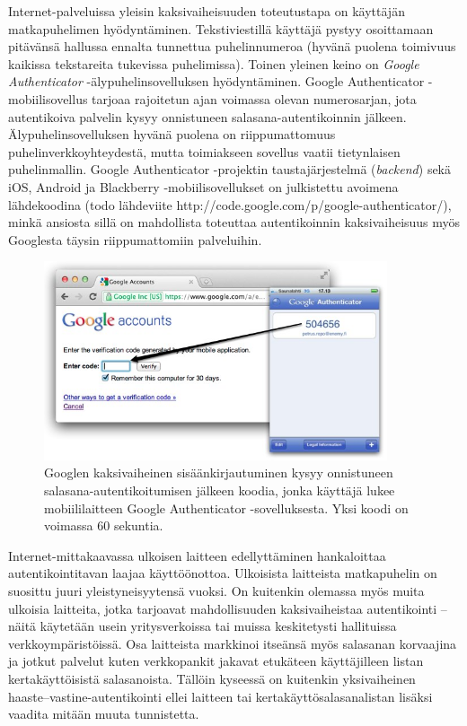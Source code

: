 \documentclass[finnish,gradu]{tktltiki}
\begin{document}
  Internet-palveluissa yleisin kaksivaiheisuuden toteutustapa on käyttäjän matkapuhelimen hyödyntäminen. Tekstiviestillä käyttäjä pystyy osoittamaan pitävänsä hallussa ennalta tunnettua puhelinnumeroa (hyvänä puolena toimivuus kaikissa tekstareita tukevissa puhelimissa). Toinen yleinen keino on \emph{Google Authenticator} -älypuhelinsovelluksen hyödyntäminen. Google Authenticator -mobiilisovellus tarjoaa rajoitetun ajan voimassa olevan numerosarjan, jota autentikoiva palvelin kysyy onnistuneen salasana-autentikoinnin jälkeen. Älypuhelinsovelluksen hyvänä puolena on riippumattomuus puhelinverkkoyhteydestä, mutta toimiakseen sovellus vaatii tietynlaisen puhelinmallin. Google Authenticator -projektin taustajärjestelmä (\emph{backend}) sekä iOS, Android ja Blackberry -mobiilisovellukset on julkistettu avoimena lähdekoodina (todo lähdeviite http://code.google.com/p/google-authenticator/), minkä ansiosta sillä on mahdollista toteuttaa autentikoinnin kaksivaiheisuus myös Googlesta täysin riippumattomiin palveluihin.

  \begin{figure}
    \centering
    \includegraphics[width=0.9\textwidth]{images/google_authenticator.jpg}
    \caption{Googlen kaksivaiheinen sisäänkirjautuminen kysyy onnistuneen salasana-autentikoitumisen jälkeen koodia, jonka käyttäjä lukee mobiililaitteen Google Authenticator -sovelluksesta. Yksi koodi on voimassa 60 sekuntia.}
    \label{fig:google_authenticator}
  \end{figure}

  Internet-mittakaavassa ulkoisen laitteen edellyttäminen hankaloittaa autentikointitavan laajaa käyttöönottoa. Ulkoisista laitteista matkapuhelin on suosittu juuri yleistyneisyytensä vuoksi. On kuitenkin olemassa myös muita ulkoisia laitteita, jotka tarjoavat mahdollisuuden kaksivaiheistaa autentikointi -- näitä käytetään usein yritysverkoissa tai muissa keskitetysti hallituissa verkkoympäristöissä. Osa laitteista markkinoi itseänsä myös salasanan korvaajina ja jotkut palvelut kuten verkkopankit jakavat etukäteen käyttäjilleen listan kertakäyttöisistä salasanoista. Tällöin kyseessä on kuitenkin yksivaiheinen haaste--vastine-autentikointi ellei laitteen tai kertakäyttösalasanalistan lisäksi vaadita mitään muuta tunnistetta.
\end{document}
